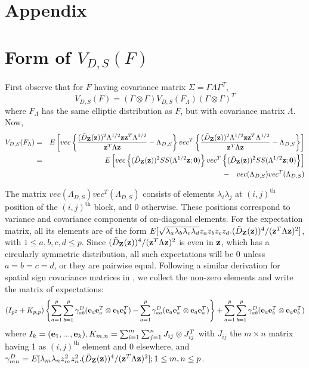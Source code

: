 
\appendix
\section*{Appendix}
\section{\textbf{Form of $V_{D,S}(F)$}}\label{section:appA}

First observe that for $F$ having covariance matrix $\Sigma = \Gamma\Lambda\Gamma^T$,
%
$$ V_{D,S}(F)  = (\Gamma \otimes \Gamma) V_{D,S}(F_\Lambda) (\Gamma \otimes \Gamma)^T$$
%
where $F_\Lambda$ has the same elliptic distribution as $F$, but with covariance matrix $\Lambda$. Now,
%
\begin{eqnarray*}
V_{D,S} (F_\Lambda) &=& E \left[ vec \left\{ \frac{(\tilde D_{\mathbf{Z}} ({\bf{z}}))^2 \Lambda^{1/2} {\bf{z}}{\bf{z}}^T \Lambda^{1/2}}{{\bf{z}}^T\Lambda{\bf{z}}} - \Lambda_{D,S} \right\} vec^T \left\{ \frac{(\tilde D_{\mathbf{Z}} ({\bf{z}}))^2 \Lambda^{1/2} {\bf{z}}{\bf{z}}^T \Lambda^{1/2}}{{\bf{z}}^T\Lambda{\bf{z}}} - \Lambda_{D,S} \right\} \right]\\
&=& E \left[ vec \left\{ (\tilde D_{\mathbf{Z}} ({\bf{z}}))^2 SS(\Lambda^{1/2}{\bf{z}}; \bf0) \right\} vec^T \left\{ (\tilde D_{\mathbf{Z}} ({\bf{z}}))^2 SS(\Lambda^{1/2}{\bf{z}}; \bf0) \right\} \right]\\
&& - \quad vec(\Lambda_{D,S}) vec^T(\Lambda_{D,S})
\end{eqnarray*}

The matrix $vec(\Lambda_{D,S}) vec^T(\Lambda_{D,S})$ consists of elements $\lambda_i\lambda_j$ at $(i,j)^\text{th}$ position of the $(i,j)^\text{th}$ block, and 0 otherwise. These positions correspond to variance and covariance components of on-diagonal elements. For the expectation matrix, all its elements are of the form $E[\sqrt{\lambda_a \lambda_b \lambda_c \lambda_d} z_a z_b z_c z_d . (\tilde D_{\mathbf{Z}} ({\bf{z}}))^4 / ({\bf{z}}^T \Lambda {\bf{z}})^2]$, with $1 \leq a,b,c,d \leq p$. Since $(\tilde D_{\mathbf{Z}} ({\bf{z}}))^4 / ({\bf{z}}^T \Lambda {\bf{z}})^2$ is even in ${\bf{z}}$, which has a circularly symmetric distribution, all such expectations will be 0 unless $a=b=c=d$, or they are pairwise equal. Following a similar derivation for spatial sign covariance matrices in \cite{magyar14}, we collect the non-zero elements and write the matrix of expectations:
%
$$ (I_{p^2} + K_{p,p}) \left\{ \sum_{a=1}^p \sum_{b=1}^p \gamma^D_{ab} ({\bf{e}}_a {\bf{e}}_a^T \otimes  {\bf{e}}_b {\bf{e}}_b^T) - \sum_{a=1}^p \gamma^D_{aa} ({\bf{e}}_a {\bf{e}}_a^T \otimes  {\bf{e}}_a {\bf{e}}_a^T) \right\} + \sum_{a=1}^p \sum_{b=1}^p \gamma^D_{ab} ({\bf{e}}_a {\bf{e}}_b^T \otimes  {\bf{e}}_a {\bf{e}}_b^T) $$
%
where $I_k = ({\bf{e}}_1,...,{\bf{e}}_k), K_{m,n} = \sum_{i=1}^m \sum_{j=1}^n J_{ij} \otimes J_{ij}^T$ with $J_{ij}$ the $m \times n$ matrix having 1 as $(i,j)^\text{th}$ element and 0 elsewhere, and $\gamma^D_{mn} = E[ \lambda_m \lambda_n z_m^2 z_n ^2 . (\tilde D_{\mathbf{Z}} ({\bf{z}}))^4 / ({\bf{z}}^T \Lambda {\bf{z}})^2]; 1 \leq m,n \leq p$.

